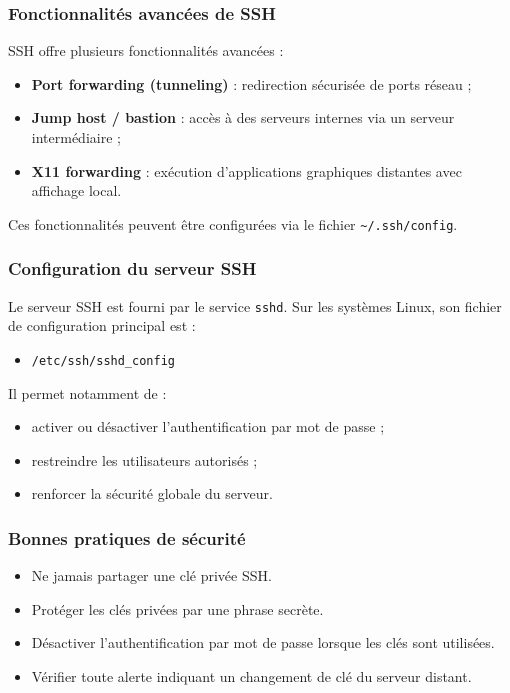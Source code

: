 \documentclass{article}
\begin{document}
\subsubsection{Fonctionnalités avancées de SSH}

SSH offre plusieurs fonctionnalités avancées :
\begin{itemize}
    \item \textbf{Port forwarding (tunneling)} : redirection sécurisée de ports réseau ;
    \item \textbf{Jump host / bastion} : accès à des serveurs internes via un serveur intermédiaire ;
    \item \textbf{X11 forwarding} : exécution d’applications graphiques distantes avec affichage local.
\end{itemize}

Ces fonctionnalités peuvent être configurées via le fichier \texttt{\textasciitilde/.ssh/config}.

\subsubsection{Configuration du serveur SSH}

Le serveur SSH est fourni par le service \texttt{sshd}.  
Sur les systèmes Linux, son fichier de configuration principal est :
\begin{itemize}
    \item \texttt{/etc/ssh/sshd\_config}
\end{itemize}

Il permet notamment de :
\begin{itemize}
    \item activer ou désactiver l’authentification par mot de passe ;
    \item restreindre les utilisateurs autorisés ;
    \item renforcer la sécurité globale du serveur.
\end{itemize}

\subsubsection{Bonnes pratiques de sécurité}

\begin{itemize}
    \item Ne jamais partager une clé privée SSH.
    \item Protéger les clés privées par une phrase secrète.
    \item Désactiver l’authentification par mot de passe lorsque les clés sont utilisées.
    \item Vérifier toute alerte indiquant un changement de clé du serveur distant.
\end{itemize}
\end{document}
